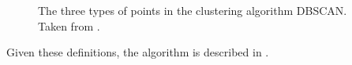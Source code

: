 \begin{figure}
\caption{The three types of points in the clustering algorithm DBSCAN. Taken from \cite[page 528]{pang2006introduction}.}
\label{dbscan_point_types}
\end{figure}

Given these definitions, the algorithm is described in .

